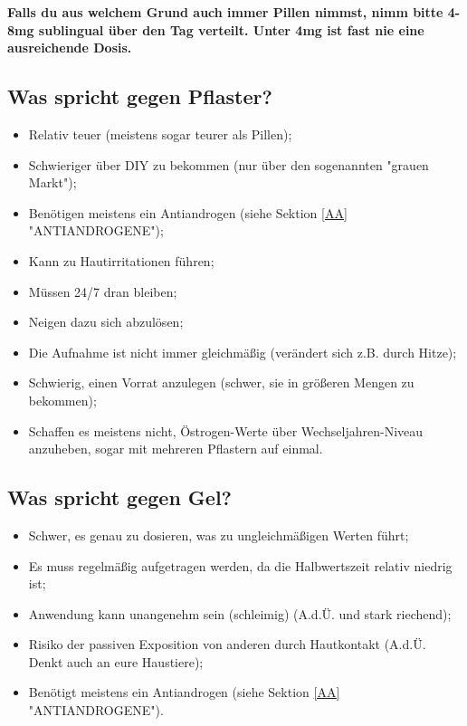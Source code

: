 \documentclass{article}
\begin{document}
\textbf{Falls du aus welchem Grund auch immer Pillen nimmst, nimm bitte 4-8mg sublingual über den Tag verteilt. Unter 4mg ist fast nie eine ausreichende Dosis.}

\subsection{Was spricht gegen Pflaster?}

\begin{itemize}
  \item Relativ teuer (meistens sogar teurer als Pillen);
  \item Schwieriger über DIY zu bekommen (nur über den sogenannten "grauen Markt");
  \item Benötigen meistens ein Antiandrogen (siehe Sektion \ref{AA} "ANTIANDROGENE");
  \item Kann zu Hautirritationen führen;
  \item Müssen 24/7 dran bleiben;
  \item Neigen dazu sich abzulösen;
  \item Die Aufnahme ist nicht immer gleichmäßig (verändert sich z.B. durch Hitze);
  \item Schwierig, einen Vorrat anzulegen (schwer, sie in größeren Mengen zu bekommen);
  \item Schaffen es meistens nicht, Östrogen-Werte über Wechseljahren-Niveau anzuheben, sogar mit mehreren Pflastern auf einmal.
\end{itemize}

\subsection{Was spricht gegen Gel?}

\begin{itemize}
  \item Schwer, es genau zu dosieren, was zu ungleichmäßigen Werten führt;
  \item Es muss regelmäßig aufgetragen werden, da die Halbwertszeit relativ niedrig ist;
  \item Anwendung kann unangenehm sein (schleimig) (A.d.Ü. und stark riechend);
  \item Risiko der passiven Exposition von anderen durch Hautkontakt (A.d.Ü. Denkt auch an eure Haustiere);
  \item Benötigt meistens ein Antiandrogen (siehe Sektion \ref{AA} "ANTIANDROGENE").
\end{itemize}
\end{document}

